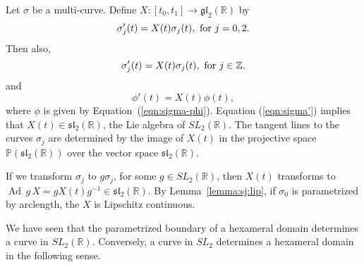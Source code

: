 \documentclass[11pt]{amsart}
\def\op#1{{\operatorname{#1}}}
\newcommand{\ring}[1]{\mathbb{#1}}
\def\rZ{{\ring{Z}}}
\def\rR{{\ring{R}}}
\def\rP{{\ring{P}}}
\begin{document}

Let $\sigma$ be a multi-curve.  Define $X:[t_0,t_1]\to\mathfrak{gl}_2(\rR)$
by
$$\sigma'_j(t) = X(t)\sigma_j(t),\hbox{ for } j = 0,2.$$
Then also,
$$
\sigma'_j(t) = X(t)\sigma_j(t),\hbox{ for } j\in\rZ.
$$
and
\begin{equation}\label{eqn:Xt}
\phi'(t) = X(t) \phi(t),
\end{equation}
where $\phi$ is given by Equation~(\ref{eqn:sigma-phi}).  Equation
(\ref{eqn:sigma'}) implies that $X(t)\in\mathfrak{sl}_2(\rR)$, the Lie
algebra of $SL_2(\rR)$.  The tangent lines to the curves $\sigma_j$
are determined by the image of $X(t)$ in the projective space
$\rP(\mathfrak{sl}_2(\rR))$ over the vector space
$\mathfrak{sl}_2(\rR)$.

If we transform $\sigma_j$ to $g\sigma_j$, for some $g\in SL_2(\rR)$,
then $X(t)$ transforms to $\op{Ad}\, g\, X = g X(t) g^{-1}\in \mathfrak{sl}_2(\rR)$.
By Lemma~\ref{lemma:sj:lip}, if $\sigma_0$ is parametrized by arclength, the
$X$ is Lipschitz continuous.

We have seen that the parametrized boundary of a hexameral domain
determines a curve in $SL_2(\ring{R})$.  Conversely, a curve in $SL_2$
determines a hexameral domain in the following sense.
\end{document}
